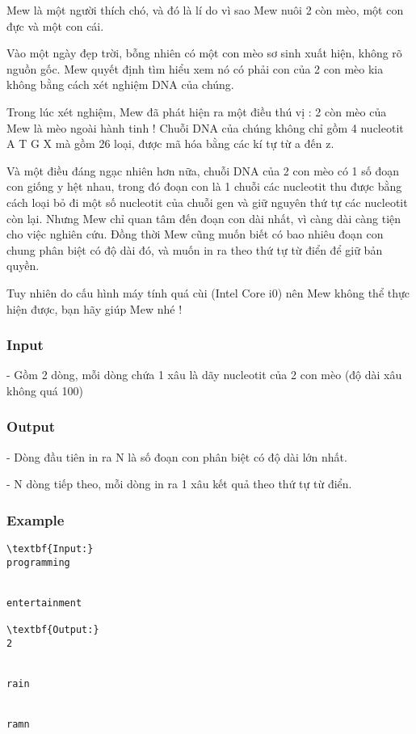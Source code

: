 



   Mew là một người thích chó, và đó là lí do vì sao Mew nuôi 2 còn mèo, một con đực và một con cái.  

   Vào một ngày đẹp trời, bỗng nhiên có một con mèo sơ sinh xuất hiện, không rõ nguồn gốc. Mew quyết định tìm hiểu xem nó có phải con của 2 con mèo kia không bằng cách xét nghiệm DNA của chúng.  

   Trong lúc xét nghiệm, Mew đã phát hiện ra một điều thú vị : 2 còn mèo của Mew là mèo ngoài hành tinh ! Chuỗi DNA của chúng không chỉ gồm 4 nucleotit A T G X mà gồm 26 loại, được mã hóa bằng các kí tự từ a đến z.  

   Và một điều đáng ngạc nhiên hơn nữa, chuỗi DNA của 2 con mèo có 1 số đoạn con giống y hệt nhau, trong đó đoạn con là 1 chuỗi các nucleotit thu được bằng cách loại bỏ đi một số nucleotit của chuỗi gen và giữ nguyên thứ tự các nucleotit còn lại. Nhưng Mew chỉ quan tâm đến đoạn con dài nhất, vì càng dài càng tiện cho việc nghiên cứu. Đồng thời Mew cũng muốn biết có bao nhiêu đoạn con chung phân biệt có độ dài đó, và muốn in ra theo thứ tự từ điển để giữ bản quyền.  

   Tuy nhiên do cấu hình máy tính quá cùi (Intel Core i0) nên Mew không thể thực hiện được, bạn hãy giúp Mew nhé !  

\subsubsection{   Input  }

   - Gồm 2 dòng, mỗi dòng chứa 1 xâu là dãy nucleotit của 2 con mèo (độ dài xâu không quá 100)  

\subsubsection{   Output  }

   - Dòng đầu tiên in ra N là số đoạn con phân biệt có độ dài lớn nhất.  

   - N dòng tiếp theo, mỗi dòng in ra 1 xâu kết quả theo thứ tự từ điển.  

\subsubsection{   Example  }
\begin{verbatim}
\textbf{Input:}
programming


entertainment

\textbf{Output:}
2


rain


ramn \end{verbatim}
